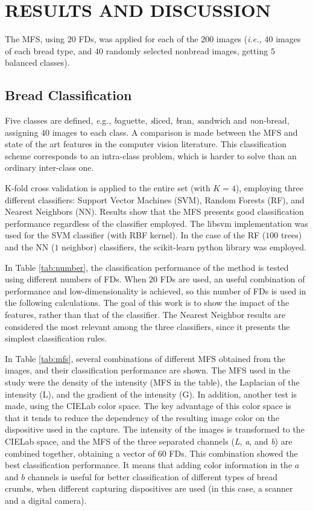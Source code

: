 \documentclass[a4paper,10pt]{article}
\begin{document}
\section{RESULTS AND DISCUSSION}

The MFS, using $20$ FDs, was applied for each of the $200$ images ({\em i.e.,} $40$ images of each bread type, and $40$ randomly selected nonbread images, getting $5$ balanced classes).

\subsection{Bread Classification}
\label{sec:10}
Five classes are defined, {\emph e.g.}, {\emph baguette}, {\emph sliced}, {\emph bran}, {\emph sandwich} and {\emph non-bread}, assigning $40$ images to each class. A comparison is made between the MFS and state of the art features in the computer vision literature. This classification scheme corresponds to an intra-class problem, which is harder to solve than an ordinary inter-class one. 

K-fold cross validation is applied to the entire set (with $K=4$), employing three different classifiers: Support Vector Machines (SVM), Random Forests (RF), and Nearest Neighbors (NN). Results show that the MFS presents good classification performance regardless of the classifier employed. The libsvm implementation \cite{Chang2011} was used for the SVM classifier (with RBF kernel). In the case of the RF ($100$ trees) and the NN ($1$ neighbor) classifiers, the scikit-learn python library was employed.

In Table \ref{tab:number}, the classification performance of the method is tested using different numbers of FDs. When $20$ FDs are used, an useful combination of performance and low-dimensionality is achieved, so this number of FDs is used in the following calculations. The goal of this work is to show the impact of the features, rather than that of the classifier. The Nearest Neighbor results are considered the most relevant among the three classifiers, since it presents the simplest classification rules.

In Table \ref{tab:mfs}, several combinations of different MFS obtained from the images, and their classification performance are shown. The MFS used in the study were the density of the intensity (MFS in the table), the Laplacian of the intensity (L), and the gradient of the intensity (G). In addition, another test is made, using the CIELab color space. The key advantage of this color space is that it tends to reduce the dependency of the resulting image color on the dispositive used in the capture. The intensity of the images is transformed to the CIELab space, and the MFS of the three separated channels ({\em L}, {\em a}, and {\em b}) are combined together, obtaining a vector of $60$ FDs. This combination showed the best classification performance. It means that adding color information in the $a$ and $b$ channels is useful for better classification of different types of bread crumbs, when different capturing dispositives are used (in this case, a scanner and a digital camera).
\end{document}
